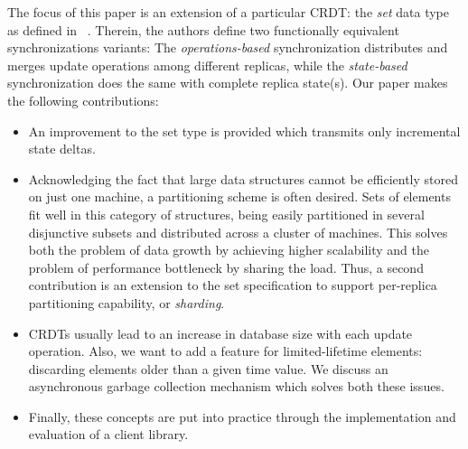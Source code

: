 The focus of this paper is an extension of a particular CRDT: the \textit{set} data type as defined in ~\cite{Shapiro:2011:CRD:2050613.2050642}. Therein, the authors define two functionally equivalent synchronizations variants: The \textit{operations-based} synchronization distributes and merges update operations among different replicas, while the \textit{state-based} synchronization does the same with complete replica state(s). Our paper makes the following contributions:
\begin{itemize}
  \item An improvement to the set type is provided which
  transmits only incremental state deltas.
  \item Acknowledging the fact that large data structures cannot be efficiently
  stored on just one machine, a partitioning scheme is often desired. Sets of
  elements fit well in this category of structures, being easily partitioned in
  several disjunctive subsets and distributed across a cluster of machines.
  This solves both the problem of data growth by achieving higher scalability
  and the problem of performance bottleneck by sharing the load. Thus, a second
  contribution is an extension to the set specification to support per-replica
  partitioning capability, or \textit{sharding}.
  \item CRDTs usually lead to an increase in database size with each update
  operation. Also, we want to add a feature for limited-lifetime elements:
  discarding elements older than a given time value. We discuss an asynchronous
  garbage collection mechanism which solves both these issues.
  \item Finally, these concepts are put into practice through the implementation
  and evaluation of a client library.
\end{itemize}